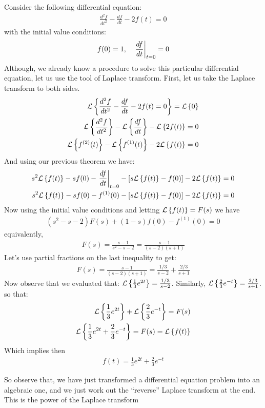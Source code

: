 \begin{mdframed}
	Consider the following differential equation:
	\begin{align*}
	\frac{d^2f}{dt^2} - \frac{df}{dt} - 2f(t) = 0
	\end{align*}
	with the initial value conditions:
	\begin{align*}
	f(0) = 1, \quad \left. \frac{df}{dt} \right|_{t = 0} = 0
	\end{align*}
	Although, we already know a procedure to solve this particular differential equation, let us use the tool of Laplace transform. First, let us take the Laplace transform to both sides.
	\begin{align*}
	\mathcal{L}\left\lbrace \frac{d^2f}{dt^2} - \frac{df}{dt} - 2f(t) = 0 \right\rbrace = \mathcal{L}\left\lbrace 0 \right\rbrace \\
	\mathcal{L}\left\lbrace \frac{d^2f}{dt^2} \right\rbrace - \mathcal{L}\left\lbrace \frac{df}{dt} \right\rbrace - \mathcal{L}\left\lbrace 2f(t) \right\rbrace = 0\\
	\mathcal{L}\left\lbrace f^{(2)}(t) \right\rbrace - \mathcal{L}\left\lbrace f^{(1)}(t) \right\rbrace -2\mathcal{L}\left\lbrace f(t) \right\rbrace  = 0
	\end{align*}
	And using our previous theorem we have:
	\begin{align*}
		s^2\mathcal{L}\left\lbrace f(t) \right\rbrace - sf(0) - \left. \frac{df}{dt} \right|_{t = 0} - \left[ s\mathcal{L}\left\lbrace f(t) \right\rbrace - f(0) \right] -2\mathcal{L}\left\lbrace f(t) \right\rbrace = 0 \\
		s^2\mathcal{L}\left\lbrace f(t) \right\rbrace - sf(0) - f^{(1)}(0) - \left[ s\mathcal{L}\left\lbrace f(t) \right\rbrace - f(0) \right] -2\mathcal{L}\left\lbrace f(t) \right\rbrace = 0 \\
	\end{align*}
	Now using the initial value conditions and letting $ \mathcal{L}\left\lbrace f(t) \right\rbrace = F(s) $ we have
	\begin{align*}
	\left( s^2 - s -2\right)F(s) + (1-s)f(0) - f^{(1)}(0) = 0
	\end{align*}
	equivalently,
	\begin{align*}
	F(s) = \frac{s-1}{s^2 - s -2} = \frac{s-1}{(s-2)(s+1)}
	\end{align*}
	Let's use partial fractions on the last inequality to get:
	\begin{align*}
	F(s) = \frac{s-1}{(s-2)(s+1)} = \frac{1/3}{s-2} + \frac{2/3}{s+1}
	\end{align*}
	Now observe that we evaluated that: $ \mathcal{L}\left\lbrace \frac{1}{3}e^{2t} \right\rbrace = \frac{1/3}{s-2} $. Similarly, $ \mathcal{L}\left\lbrace \frac{2}{3}e^{-t} \right\rbrace = \frac{2/3}{s+1}$. so that:
	\begin{align*}
	\mathcal{L}\left\lbrace \frac{1}{3}e^{2t} \right\rbrace + \mathcal{L}\left\lbrace \frac{2}{3}e^{-t} \right\rbrace = F(s) \\
	\mathcal{L}\left\lbrace  \frac{1}{3}e^{2t} + \frac{2}{3}e^{-t} \right\rbrace = F(s) = \mathcal{L}\left\lbrace f(t) \right\rbrace
	\end{align*}
	Which implies then
	\begin{align*}
	f(t) = \frac{1}{3}e^{2t} + \frac{2}{3}e^{-t}
	\end{align*}
\end{mdframed}
So observe that, we have just transformed a differential equation problem into an algebraic one, and we just work out the ``reverse'' Laplace transform at the end. This is the power of the Laplace transform




